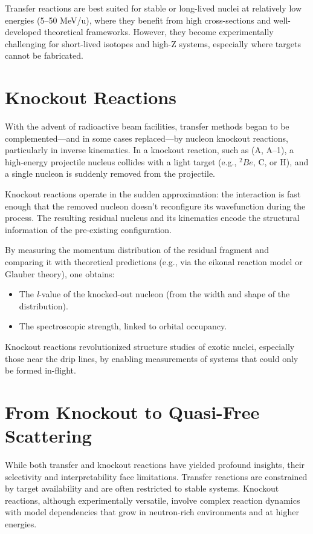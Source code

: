 Transfer reactions are best suited for stable or long-lived nuclei at relatively low energies (5–50 MeV/u), where they benefit from high cross-sections and well-developed theoretical frameworks. However, they become experimentally challenging for short-lived isotopes and high-Z systems, especially where targets cannot be fabricated.


\section{Knockout Reactions}

With the advent of radioactive beam facilities, transfer methods began to be complemented—and in some cases replaced—by nucleon knockout reactions, particularly in inverse kinematics. In a knockout reaction, such as (A, A–1), a high-energy projectile nucleus collides with a light target (e.g., $^2Be$, C, or H), and a single nucleon is suddenly removed from the projectile.

Knockout reactions operate in the sudden approximation: the interaction is fast enough that the removed nucleon doesn't reconfigure its wavefunction during the process. The resulting residual nucleus and its kinematics encode the structural information of the pre-existing configuration.

By measuring the momentum distribution of the residual fragment and comparing it with theoretical predictions (e.g., via the eikonal reaction model or Glauber theory), one obtains:

\begin{itemize}
	\item The \emph{l}-value of the knocked-out nucleon (from the width and shape of the distribution).
	\item The spectroscopic strength, linked to orbital occupancy.
\end{itemize}


Knockout reactions revolutionized structure studies of exotic nuclei, especially those near the drip lines, by enabling measurements of systems that could only be formed in-flight.

\section{From Knockout to Quasi-Free Scattering}

While both transfer and knockout reactions have yielded profound insights, their selectivity and interpretability face limitations. Transfer reactions are constrained by target availability and are often restricted to stable systems. Knockout reactions, although experimentally versatile, involve complex reaction dynamics with model dependencies that grow in neutron-rich environments and at higher energies.

